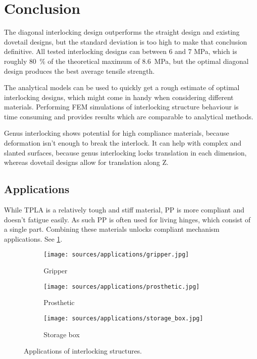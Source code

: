 \section{Conclusion}
The diagonal interlocking design outperforms the straight design and existing dovetail designs,
but the standard deviation is too high to make that conclusion definitive.
All tested interlocking designs can between 6 and 7 \si{\mega\pascal}, which is roughly \SI{80}{\percent} of the theoretical maximum of \SI{8.6}{\mega\pascal},
but the optimal diagonal design produces the best average tensile strength.

The analytical models can be used to quickly get a rough estimate of optimal interlocking designs,
which might come in handy when considering different materials.
Performing FEM simulations of interlocking structure behaviour is time consuming and provides results which are comparable to analytical methods.

Genus interlocking shows potential for high compliance materials, because deformation isn't enough to break the interlock.
It can help with complex and slanted surfaces, because genus interlocking locks translation in each dimension, 
whereas dovetail designs allow for translation along Z.



\subsection{Applications}
While TPLA is a relatively tough and stiff material, PP is more compliant and doesn't fatigue easily.
As such PP is often used for living hinges, which consist of a single part.
Combining these materials unlocks compliant mechanism applications.
See \cref{fig:applications}.


\begin{figure}
	\centering
	\begin{subfigure}[B]{.33\columnwidth}
		\centering
		\texttt{[image: sources/applications/gripper.jpg]}
		\caption{Gripper}
	\end{subfigure}
	\begin{subfigure}[B]{.33\columnwidth}
		\centering
		\texttt{[image: sources/applications/prosthetic.jpg]}
		\caption{Prosthetic}
	\end{subfigure}
	\begin{subfigure}[B]{.33\columnwidth}
		\centering
		\texttt{[image: sources/applications/storage\_box.jpg]}
		\caption{Storage box}
	\end{subfigure}
	\caption{Applications of interlocking structures.}
	\label{fig:applications}
\end{figure}




